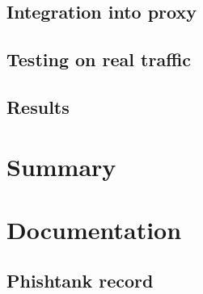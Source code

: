 \documentclass[
  digital, %
  oneside, %
  table,   %
  nolof,     %
  nolot,     %
]{fithesis3}
\begin{document}
\section{Integration into proxy}

\section{Testing on real traffic}

\section{Results}

\chapter{Summary}



\shorthandon{-}


\printbibliography[heading=bibintoc] %

\appendix
\listoftodos[Notes]

\chapter{Documentation}

\section{Phishtank record}
\label{appendix:phishtank_record}
\end{document}
